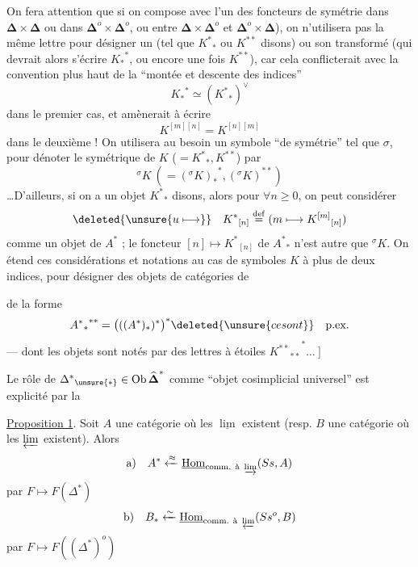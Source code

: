 On fera attention que si on compose avec l'un des foncteurs de symétrie
dans $\boldsymbol\Delta\times\boldsymbol\Delta$ ou dans $\boldsymbol\Delta^o\times\boldsymbol\Delta^o$, ou entre $\boldsymbol\Delta\times\boldsymbol\Delta^o$ et $\boldsymbol\Delta^o\times\boldsymbol\Delta$), on n'utilisera pas la même lettre pour désigner un   (tel que ${K^*}_*$ ou $K^{**}$ disons) ou son transformé (qui devrait alors s'écrire ${K_*}^*$, ou encore une fois $K^{**}$), car cela conflicterait avec la convention plus haut de la ``montée et descente des indices''
\[ {K_*}^*\simeq({K^*}_*)^\vee \]
dans le premier cas, et  amènerait à écrire
\[ K^{[m][n]}=K^{[n][m]} \]
dans le deuxième ! On utilisera au besoin un symbole ``de symétrie'' tel que $\sigma$, pour dénoter le symétrique de $K$ ($={K^*}_*,K^{**}$) par
\[ {}^\sigma K\ (= {({}^\sigma K)_*}^*,({}^\sigma K)^{**}) \]
 \ldots D'ailleurs,
si on a un objet ${K^*}_*$ disons,  alors pour $\forall n\geq0$, on peut considérer
\[
\deleted{\unsure{u\longmapsto}}\quad
{K^*}_{[n]}\overset{\mathrm{def}}{=}(m\longmapsto {K^{[m]}}_{[n]})
\]
comme un objet de $A^*$ ; le foncteur $[n]\longmapsto {K^*}_{[n]}$ de ${A^*}_*$ n'est autre que ${}^\sigma K$.
On étend ces considérations et notations au cas de symboles $K$ à plus de deux indices, pour désigner des objets de catégories de


de la forme
\[
 {{A^*}_*}^{**}=\bigl(( (A^*)_* )^*\bigr)^*
 \deleted{\unsure{ce sont}}\quad\text{p.ex.}
\]
--- dont les objets sont notés par des lettres à étoiles
$ {{K^{**}}_{**}}^*\ldots\ \Big]$

Le rôle de ${\Delta^*}_{\unsure{*}}\in\operatorname{Ob}\widehat{\boldsymbol\Delta}^{*}$
comme ``objet cosimplicial universel'' est explicité par la

\uline{Proposition 1}. Soit $A$ une catégorie où les $\underline{\lim}$ existent
(resp. $B$ une catégorie où les $\varprojlim$ existent). Alors
\[
 \text{a)}\quad A^*\xleftarrow{\approx}
 \underline{\operatorname{Hom}}_{\text{comm. à }\varinjlim}(Ss,A)
\]
par $F\longmapsto F(\Delta^*)$
\[
 \text{b)}\quad B_*\xleftarrow{\sim}
 \underline{\operatorname{Hom}}_{\text{comm. à }\varprojlim}(Ss^o,B)
\]
par $F\longmapsto F((\Delta^*)^o)$

